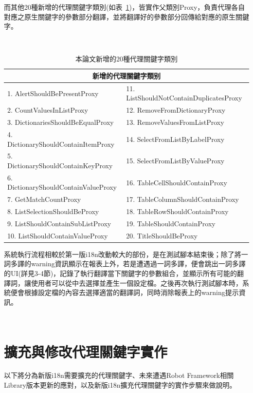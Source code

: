 而其他20種新增的代理關鍵字類別(如表~\ref{本論文新增的20種代理關鍵字類別})，皆實作父類別Proxy，負責代理各自對應之原生關鍵字的參數部分翻譯，並將翻譯好的參數部分回傳給對應的原生關鍵字。

\begin{table}[H]
    \centering
    \caption{本論文新增的20種代理關鍵字類別}
    \hspace*{\fill} \\
        \begin{tabular}{|l|l|}
        \hline
        \multicolumn{2}{|c|}{新增的代理關鍵字類别} \\ \hline
        1. AlertShouldBePresentProxy & 11. ListShouldNotContainDuplicatesProxy\\ 
        2. CountValuesInListProxy & 12. RemoveFromDictionaryProxy\\ 
        3. DictionariesShouldBeEqualProxy & 13. RemoveValuesFromListProxy\\
        4. DictionaryShouldContainItemProxy & 14. SelectFromListByLabelProxy\\
        5. DictionaryShouldContainKeyProxy & 15. SelectFromListByValueProxy\\
        6. DictionaryShouldContainValueProxy & 16. TableCellShouldContainProxy\\
        7. GetMatchCountProxy & 17. TableColumnShouldContainProxy\\
        8. ListSelectionShouldBeProxy & 18. TableRowShouldContainProxy\\
        9. ListShouldContainSubListProxy & 19. TableShouldContainProxy\\
        10. ListShouldContainValueProxy & 20. TitleShouldBeProxy\\   
        \hline
        \end{tabular}
    \label{本論文新增的20種代理關鍵字類別}
\end{table}

系統執行流程相較於第一版i18n改動較大的部份，是在測試腳本結束後；除了將一詞多譯的warning資訊顯示在報表上外，若是遭遇過一詞多譯，便會跳出一詞多譯的UI(詳見3-4節)，記錄了執行翻譯當下關鍵字的參數組合，並顯示所有可能的翻譯詞，讓使用者可以從中去選擇並產生一個設定檔。之後再次執行測試腳本時，系統便會根據設定檔的內容去選擇適當的翻譯詞，同時消除報表上的warning提示資訊。

\hspace*{\fill} \\

\section{擴充與修改代理關鍵字實作}
以下將分為新版i18n需要擴充的代理關鍵字、未來遭遇Robot Framework相關Library版本更新的應對，以及新版i18n擴充代理關鍵字的實作步驟來做說明。

